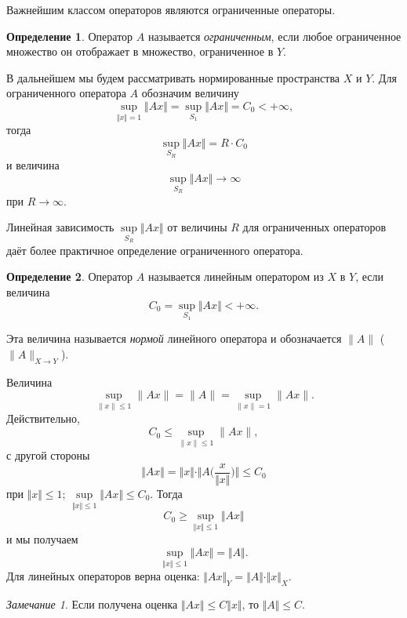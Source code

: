 \documentclass[12pt,a4paper,titlepage,oneside]{book}
\theoremstyle{definition}
\newtheorem*{definition}{Определение}
\theoremstyle{plain}
\theoremstyle{break}
\theoremstyle{remark}
\newtheorem*{remark}{Замечание}
\theoremstyle{remark}
\theoremstyle{remark}
\theoremstyle{remark}
\theoremstyle{plain}
\theoremstyle{plain}
\begin{document}
Важнейшим классом операторов являются ограниченные операторы.

\begin{definition} Оператор $A$ называется \textit{ограниченным}, если любое ограниченное множество он отображает в множество, ограниченное в $Y$.
\end{definition}

В дальнейшем мы будем рассматривать нормированные пространства $X$ и $Y$.
Для ограниченного оператора $A$  обозначим величину 
$$\underset{\Vert x\Vert=1}{\sup}\Vert Ax \Vert =\underset{S_1}{\sup}\Vert Ax \Vert =C_0<+\infty,$$
тогда
$$\underset{S_R}{\sup}\Vert Ax \Vert=R\cdot C_0$$
и величина 
$$\underset{S_R}{\sup}\Vert Ax \Vert\to\infty$$
при $R\to\infty$.

Линейная зависимость
$\underset{S_R}{\sup}\Vert Ax \Vert$
от величины $R$ для ограниченных операторов даёт более практичное определение ограниченного оператора.

\begin{definition} Оператор $A$ называется линейным оператором из $X$ в $Y$, если величина 
$$C_0=\underset{S_1}{\sup}\Vert Ax \Vert<+\infty.$$
\end{definition}
Эта величина называется \textit{нормой} линейного оператора и обозначается $\lVert A \rVert$ ($\lVert A \rVert_{X \to Y}$).

Величина 
$$\underset{\lVert x \rVert \leqslant 1}{\sup}\lVert Ax \rVert = \lVert A \rVert = \underset{\lVert x \rVert = 1}{\sup}\lVert Ax \rVert.$$
Действительно,
$$C_0 \leqslant \underset{\lVert x \rVert \leqslant 1}{\sup}\lVert Ax \rVert,$$
с другой стороны
$$\Vert Ax \Vert=
\Vert x \Vert \cdot \Vert A \big( \frac{x}{\Vert x \Vert} \big) \Vert \leqslant C_0$$
при $\Vert x \Vert \leqslant 1$; 
$\underset{\Vert x\Vert \leqslant 1}{\sup}\Vert Ax \Vert \leqslant C_0$.
Тогда
$$C_0 \geqslant\underset{\Vert x\Vert \leqslant 1}{\sup}\Vert Ax \Vert$$
и мы получаем 
$$\underset{\Vert x\Vert \leqslant 1}{\sup}\Vert Ax \Vert =\Vert A \Vert.$$
Для линейных операторов верна оценка: $\Vert Ax \Vert _{Y} =\Vert A \Vert \cdot \Vert x \Vert_{X} $.

\begin{remark}
Если получена оценка  $\Vert Ax \Vert \leqslant {C}  \Vert x \Vert$, то $\Vert A \Vert \leqslant {C} $.
\end{remark}
\end{document}

